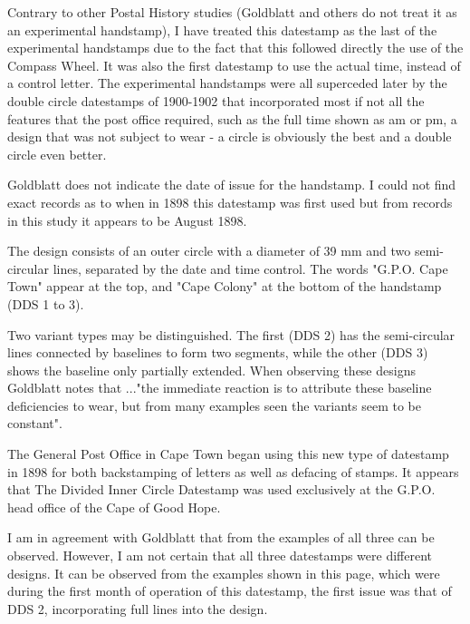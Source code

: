 Contrary to other Postal History studies (Goldblatt and others 
do not treat it as an experimental handstamp), 
I have treated this datestamp as the last of the experimental 
handstamps due to the fact that 
this followed directly the use of the Compass Wheel. 
It was also the first datestamp to use the actual time, instead 
of a control letter. 
The experimental handstamps were all superceded later by the 
double circle datestamps of 1900-1902 
that incorporated most if not all the features that the post 
office required, such as the full time 
shown as am or pm, a design that was not subject to wear - a 
circle is obviously the best and a double 
circle even better.



Goldblatt does not indicate the date of issue for the handstamp.
I could not find exact records as to when in 1898 this datestamp was 
first used but from records 
in this study it appears to be August 1898.


The design consists of an outer circle with a diameter of 39 mm and 
two semi-circular lines, separated by the date and time control. 
The words "G.P.O. Cape Town" appear at the top, and "Cape Colony" 
at the bottom of the handstamp (DDS 1 to 3). 


Two variant types may 
be distinguished. The first (DDS 2) has the semi-circular lines 
connected by baselines to form two segments, while the other (DDS 3) 
shows the baseline only partially extended. When observing these 
designs Goldblatt notes that ..."the immediate reaction is to 
attribute these baseline deficiencies to wear, but from many examples 
seen the variants seem to be constant". 

The General Post Office in Cape Town began using this new type of 
datestamp in 1898 for both backstamping of letters as well as 
defacing of stamps. It appears that The Divided Inner Circle 
Datestamp was used exclusively at the G.P.O. head office of 
the Cape of Good Hope.


I am in agreement with Goldblatt that from the examples of all 
three can be observed. However, I am not certain that all three 
datestamps were different designs. It can be observed from the 
examples shown in this page, which were during the first month
of operation of this datestamp, the first issue was that of DDS 2, 
incorporating full lines into the design.

